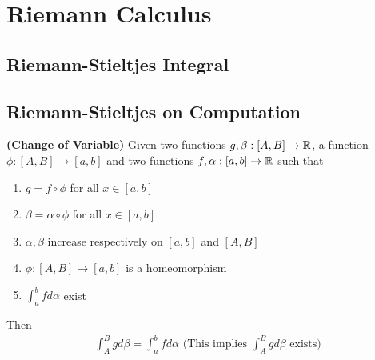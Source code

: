 \documentclass{report}
\begin{document}
\chapter{Riemann Calculus}
\section{Riemann-Stieltjes Integral}

\section{Riemann-Stieltjes on Computation}
\begin{theorem}
\label{CoV}
\textbf{(Change of Variable)} Given two functions $g,\beta  :[A,B]\rightarrow \mathbb{R}$, a function $\phi: [A,B]\rightarrow [a,b]$ and two functions $f,\alpha :[a,b]\rightarrow \mathbb{R}$ such that 
\begin{enumerate}[label=(\alph*)]
  \item $g = f \circ  \phi $ for all $x \in [a,b]$
  \item $\beta = \alpha  \circ \phi $ for all $x \in [a,b]$ 
  \item $\alpha , \beta  $ increase respectively on $[a,b]$ and $[A,B]$ 
  \item $\phi:[A,B]\rightarrow [a,b]$ is a homeomorphism 
  \item $\int_a^b fd\alpha $ exist
\end{enumerate}
Then 
\begin{align*}
\int_A^B g d\beta  =\int_a^b fd\alpha \text{   (This implies $\int_A^B gd\beta $ exists)}
\end{align*}
\end{theorem}          
\end{document}
